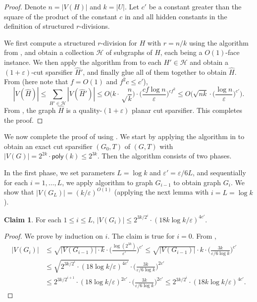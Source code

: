 \documentclass[11pt]{article}
\theoremstyle{definition}
\newtheorem{claim}[theorem]{Claim}
\newcommand{\hset}{{\mathcal{H}}}
\newcommand{\eps}{{\varepsilon}}
\newcommand{\poly}{\mathsf{poly}}
\newcounter{note}
\begin{document}
\begin{proof}
Denote $n=|V(H)|$ and $k=|U|$. Let $c'$ be a constant greater than the square of the product of the constant $c$ in  and all hidden constants in the definition of structured $r$-divisions.

We first compute a structured $r$-division for $H$ with $r=n/k$ using the algorithm from , and obtain a collection $\hset$ of subgraphs of $H$, each being a $O(1)$-face instance. We then apply the algorithm from  to each $H'\in \hset$ and obtain a $(1+\eps)$-cut sparsifier $\hat H'$, and finally glue all of them together to obtain $\hat H$.
From  (here note that $f=O(1)$ and $f^2c\le c'$),
\[
|V(\hat H)|\le \sum_{H'\in \hset}|V(\hat H')|\le O\bigg(k\cdot \sqrt\frac{n}{k}\bigg)\cdot \bigg(\frac{cf \log n}{\eps}\bigg)^{cf^2}\le O\bigg(\sqrt{nk}\cdot \bigg(\frac{\log n}{\eps}\bigg)^{c'}\bigg).
\]
From , the graph $\hat H$ is a quality-$(1+\eps)$ planar cut sparsifier. 
This completes the proof.
\end{proof}


We now complete the proof of  using . We start by applying the algorithm in \cite{krauthgamer2017refined} to obtain an exact cut sparsifier $(G_0,T)$ of $(G,T)$ with $|V(G)|=2^{2k}\cdot \poly(k)\le 2^{3k}$.
Then the algorithm consists of two phases.

In the first phase, we set parameters $L=\log k$ and $\eps'=\eps/6L$, and sequentially for each $i=1,\ldots,L$, we apply algorithm  to graph $G_{i-1}$ to obtain graph $G_i$.
We show that $|V(G_L)|=(k/\eps)^{O(1)}$ (applying the next lemma with $i=L=\log k$).

\begin{claim}
For each $1\le i\le L$, $|V(G_i)|\le 2^{3k/2^i}\cdot (18k\log k/\eps)^{4c'}$.
\end{claim}
\begin{proof}
We prove by induction on $i$. The claim is true for $i=0$.
From ,
\[
\begin{split}
|V(G_i)| & \le \sqrt{|V(G_{i-1})|\cdot k}\cdot \bigg(\frac{\log (2^{3k})}{\eps'}\bigg)^{c'}
\le 
\sqrt{|V(G_{i-1})|}\cdot k\cdot\bigg(\frac{3k}{\eps/6\log k}\bigg)^{c'}\\
& \le \sqrt{2^{3k/2^i}\cdot (18\log k/\eps)^{4c'}}\cdot\bigg(\frac{3k}{\eps/6\log k}\bigg)^{2c'}\\
& \le 2^{3k/2^{i+1}}\cdot (18\log k/\eps)^{2c'}\cdot \bigg(\frac{3k}{\eps/6\log k}\bigg)^{2c'}
\le 2^{3k/2^i}\cdot (18k\log k/\eps)^{4c'}.
\end{split}
\]
\end{proof}
\end{document}
